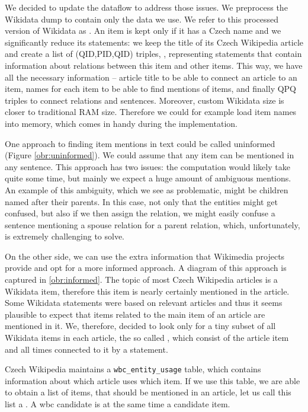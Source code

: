 We decided to update the dataflow to address those issues. We preprocess the Wikidata dump to contain only the data we use. We refer to this processed version of Wikidata as . An item is kept only if it has a Czech name and we significantly reduce its statements: we keep the title of its Czech Wikipedia article and create a list of (QID,PID,QID) triples, , representing statements that contain information about relations between this item and other items. This way, we have all the necessary information -- article title to be able to connect an article to an item, names for each item to be able to find mentions of items, and finally QPQ triples to connect relations and sentences. Moreover, custom Wikidata size is closer to traditional RAM size. Therefore we could for example load item names into memory, which comes in handy during the implementation.

One approach to finding item mentions in text could be called uninformed (Figure \ref{obr:uninformed}). We could assume that any item can be mentioned in any sentence. This approach has two issues: the computation would likely take quite some time, but mainly we expect a huge amount of ambiguous mentions. An example of this ambiguity, which we see as problematic, might be children named after their parents. In this case, not only that the entities might get confused, but also if we then assign the relation, we might easily confuse a sentence mentioning a spouse relation for a parent relation, which, unfortunately, is extremely challenging to solve. 

On the other side, we can use the extra information that Wikimedia projects provide and opt for a more informed approach. A diagram of this approach is captured in \autoref{obr:informed}. The topic of most Czech Wikipedia articles is a Wikidata item, therefore this item is nearly certainly mentioned in the article. Some Wikidata statements were based on relevant articles and thus it seems plausible to expect that items related to the main item of an article are mentioned in it. We, therefore, decided to look only for a tiny subset of all Wikidata items in each article, the so called , which consist of the article item and all times connected to it by a statement.


Czech Wikipedia maintains a \verb|wbc_entity_usage| table, which contains information about which article uses which item. If we use this table, we are able to obtain a list of items, that should be mentioned in an article, let us call this list a . A wbc candidate is at the same time a candidate item.

